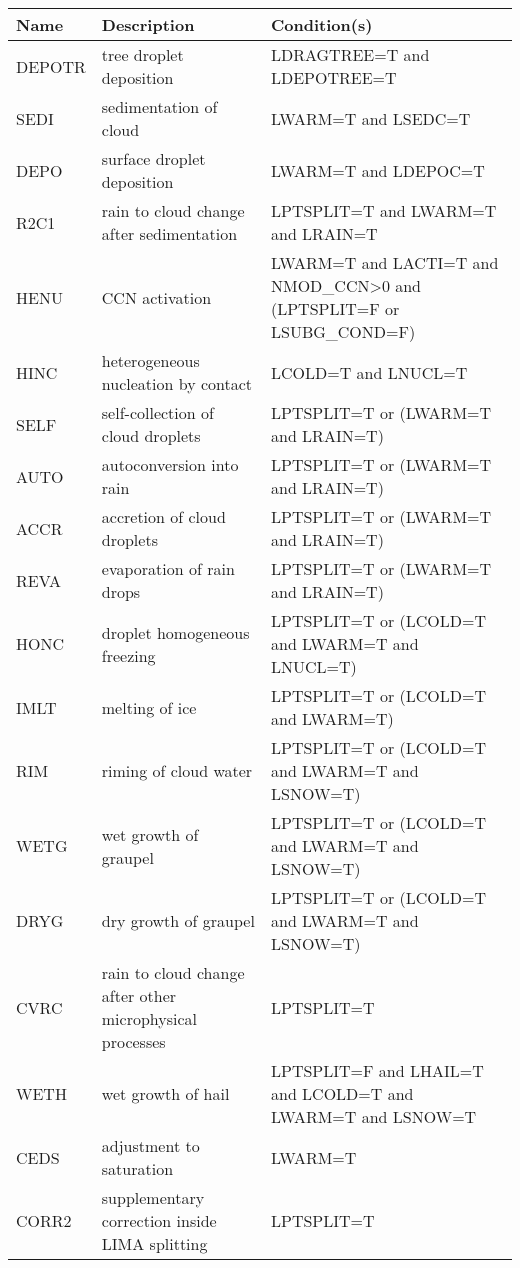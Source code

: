 \begin{longtable} {|p{}|p{}|p{}|}
\hline
Name & Description & Condition(s) \\
\hline \hline
\endhead
DEPOTR & tree droplet deposition                                  & LDRAGTREE=T and LDEPOTREE=T \\\hline
SEDI   & sedimentation of cloud                                   & LWARM=T and LSEDC=T \\\hline
DEPO   & surface droplet deposition                               & LWARM=T and LDEPOC=T \\\hline
R2C1   & rain to cloud change after sedimentation                 & LPTSPLIT=T and LWARM=T and LRAIN=T \\\hline
HENU   & CCN activation                                           & LWARM=T and LACTI=T and NMOD\_CCN>0 and (LPTSPLIT=F or LSUBG\_COND=F) \\\hline
HINC   & heterogeneous nucleation by contact                      & LCOLD=T and LNUCL=T \\\hline
SELF   & self-collection of cloud droplets                        & LPTSPLIT=T or (LWARM=T and LRAIN=T) \\\hline
AUTO   & autoconversion into rain                                 & LPTSPLIT=T or (LWARM=T and LRAIN=T) \\\hline
ACCR   & accretion of cloud droplets                              & LPTSPLIT=T or (LWARM=T and LRAIN=T) \\\hline
REVA   & evaporation of rain drops                                & LPTSPLIT=T or (LWARM=T and LRAIN=T) \\\hline
HONC   & droplet homogeneous freezing                             & LPTSPLIT=T or (LCOLD=T and LWARM=T and LNUCL=T) \\\hline
IMLT   & melting of ice                                           & LPTSPLIT=T or (LCOLD=T and LWARM=T) \\\hline
RIM    & riming of cloud water                                    & LPTSPLIT=T or (LCOLD=T and LWARM=T and LSNOW=T) \\\hline
WETG   & wet growth of graupel                                    & LPTSPLIT=T or (LCOLD=T and LWARM=T and LSNOW=T) \\\hline
DRYG   & dry growth of graupel                                    & LPTSPLIT=T or (LCOLD=T and LWARM=T and LSNOW=T) \\\hline
CVRC   & rain to cloud change after other microphysical processes & LPTSPLIT=T \\\hline
WETH   & wet growth of hail                                       & LPTSPLIT=F and LHAIL=T and LCOLD=T and LWARM=T and LSNOW=T \\\hline
CEDS   & adjustment to saturation                                 & LWARM=T \\\hline
CORR2  & supplementary correction inside LIMA splitting           & LPTSPLIT=T \\\hline
\end{longtable}

